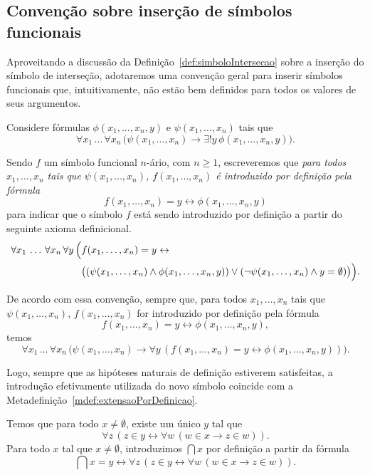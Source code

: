 \subsection{Convenção sobre inserção de símbolos funcionais}\label{subsec:convencaoSobreInsercaoDeSimbolosFuncionais}
Aproveitando a discussão da Definição~\ref{def:simboloIntersecao} sobre a inserção do símbolo de interseção, adotaremos uma convenção geral para inserir símbolos funcionais que, intuitivamente, não estão bem definidos para todos os valores de seus argumentos.

\begin{convention}[$\BST$]\label{conv:insercaoDeSimboloFuncional}
    Considere fórmulas $\phi(x_1, \dots, x_n, y)$ e $\psi(x_1, \dots, x_n)$ tais que
    \[
        \forall x_1\, \dots\, \forall x_n\,
        \bigl(\psi(x_1,\dots,x_n) \rightarrow \exists! y\,\phi(x_1,\dots,x_n,y)\bigr).
    \]

    Sendo $f$ um símbolo funcional $n$-ário, com $n\geq 1$, escreveremos que
    \emph{para todos $x_1, \dots, x_n$ tais que $\psi(x_1, \dots, x_n)$,
    $f(x_1, \dots, x_n)$ é introduzido por definição pela fórmula}
    \[
        f(x_1, \dots, x_n)=y\leftrightarrow \phi(x_1, \dots, x_n, y)
    \]
    para indicar que o símbolo $f$ está sendo introduzido por definição a partir do seguinte axioma definicional.
    \[
        \begin{aligned}
            \forall x_1\, \dots\, \forall x_n\, \forall y\,
            \Bigl(
                &f(x_1,\dots,x_n)=y \leftrightarrow \\
                &\bigl((\psi(x_1,\dots,x_n)\land \phi(x_1,\dots,x_n,y))
                \vee (\neg\psi(x_1,\dots,x_n)\land y=\emptyset)\bigr)
            \Bigr).
        \end{aligned}
    \]
\end{convention}

De acordo com essa convenção, sempre que, para todos $x_1,\dots,x_n$ tais que $\psi(x_1,\dots,x_n)$, $f(x_1,\dots,x_n)$ for introduzido por definição pela fórmula
\[
    f(x_1,\dots,x_n)=y \leftrightarrow \phi(x_1,\dots,x_n,y),
\]
temos
\[
    \forall x_1\, \dots\, \forall x_n\,
    \bigl(\psi(x_1,\dots,x_n) \rightarrow \forall y\,(f(x_1,\dots,x_n)=y \leftrightarrow \phi(x_1,\dots,x_n,y))\bigr).
\]

Logo, sempre que as hipóteses naturais de definição estiverem satisfeitas, a introdução efetivamente utilizada do novo símbolo coincide com a Metadefinição~\ref{mdef:extensaoPorDefinicao}.
\begin{example}[$\BST$]
    Temos que para todo $x \neq \emptyset$, existe um único $y$ tal que
    \[
        \forall z\, (z \in y \leftrightarrow \forall w\, (w \in x \rightarrow z \in w)).
    \]
    Para todo $x$ tal que $x \neq \emptyset$, introduzimos $\bigcap x$ por definição a partir da fórmula
    \[
        \bigcap x = y \leftrightarrow \forall z\, (z \in y \leftrightarrow \forall w\, (w \in x \rightarrow z \in w)).
    \]
\end{example}

